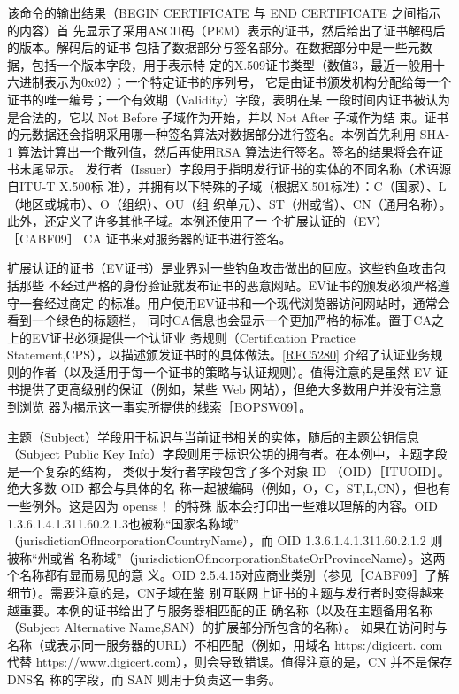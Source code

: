 该命令的输出结果（BEGIN CERTIFICATE 与 END CERTIFICATE 之间指示的内容）首
先显示了采用ASCII码（PEM）表示的证书，然后给出了证书解码后的版本。解码后的证书
包括了数据部分与签名部分。在数据部分中是一些元数据，包括一个版本字段，用于表示特
定的X.509证书类型（数值3，最近一般用十六进制表示为0x02）；一个特定证书的序列号，
它是由证书颁发机构分配给每一个证书的唯一编号；一个有效期（Validity）字段，表明在某
一段时间内证书被认为是合法的，它以 Not Before 子域作为开始，并以 Not After 子域作为结
束。证书的元数据还会指明采用哪一种签名算法对数据部分进行签名。本例首先利用 SHA-1
算法计算出一个散列值，然后再使用RSA 算法进行签名。签名的结果将会在证书末尾显示。
发行者（Issuer）字段用于指明发行证书的实体的不同名称（术语源自ITU-T X.500标
准），并拥有以下特殊的子域（根据X.501标准）：C（国家）、L（地区或城市）、O（组织）、OU（组
织单元）、ST（州或省）、CN（通用名称）。此外，还定义了许多其他子域。本例还使用了一
个扩展认证的（EV）［CABF09］ CA 证书来对服务器的证书进行签名。

扩展认证的证书（EV证书）是业界对一些钓鱼攻击做出的回应。这些钓鱼攻击包括那些
不经过严格的身份验证就发布证书的恶意网站。EV证书的颁发必须严格遵守一套经过商定
的标准。用户使用EV证书和一个现代浏览器访问网站时，通常会看到一个绿色的标题栏，
同时CA信息也会显示一个更加严格的标准。置于CA之上的EV证书必须提供一个认证业
务规则（Certification Practice Statement,CPS），以描述颁发证书时的具体做法。\href{https://www.rfc-editor.org/rfc/rfc5280}{[RFC5280]}
介绍了认证业务规则的作者（以及适用于每一个证书的策略与认证规则）。值得注意的是虽然
EV 证书提供了更高级别的保证（例如，某些 Web 网站），但绝大多数用户并没有注意到浏览
器为揭示这一事实所提供的线索［BOPSW09］。

主题（Subject）学段用于标识与当前证书相关的实体，随后的主题公钥信息（Subject
Public Key Info）字段则用于标识公钥的拥有者。在本例中，主题字段是一个复杂的结构，
类似于发行者字段包含了多个对象 ID （OID）［ITUOID］。绝大多数 OID 都会与具体的名
称一起被编码（例如，O，C，ST,L,CN），但也有一些例外。这是因为 openss！ 的特殊
版本会打印出一些难以理解的内容。OID 1.3.6.1.4.1.311.60.2.1.3也被称“国家名称域”
（jurisdictionOflncorporationCountryName），而 OID 1.3.6.1.4.1.311.60.2.1.2 则被称“州或省
名称域”（jurisdictionOflncorporationStateOrProvinceName）。这两个名称都有显而易见的意
义。OID 2.5.4.15对应商业类别（参见［CABF09］了解细节）。需要注意的是，CN子域在鉴
别互联网上证书的主题与发行者时变得越来越重要。本例的证书给出了与服务器相匹配的正
确名称（以及在主题备用名称（Subject Alternative Name,SAN）的扩展部分所包含的名称）。
如果在访问时与名称（或表示同一服务器的URL）不相匹配（例如，用域名 https:/digicert.
com 代替 https://www.digicert.com），则会导致错误。值得注意的是，CN 并不是保存DNS名
称的字段，而 SAN 则用于负责这一事务。

